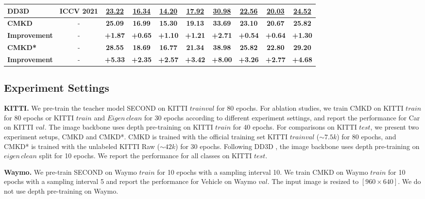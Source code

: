 \documentclass[runningheads]{llncs}
\begin{document}
\begin{table*}[t]
{\begin{tabular}{l|l|cccc|cccc}
    DD3D \cite{dd3d}     &ICCV 2021    & \underline{23.22}  & \underline{16.34}  & \underline{14.20} & \underline{17.92} & \underline{30.98}  & \underline{22.56}  & \underline{20.03} & \underline{24.52}\\
    \midrule
    \textbf{CMKD} &\multicolumn{1}{c|}{-}   & \textbf{25.09}  & \textbf{16.99}  & \textbf{15.30}  & \textbf{19.13} & \textbf{33.69}  & \textbf{23.10}  & \textbf{20.67} & \textbf{25.82} \\
    \textbf{Improvement} &\multicolumn{1}{c|}{-}  &\textbf{+1.87}  & \textbf{+0.65}  &\textbf{+1.10} &\textbf{+1.21} &\textbf{+2.71}  &\textbf{+0.54}  &\textbf{+0.64} &\textbf{+1.30} \\
    \midrule
    \textbf{CMKD*} &\multicolumn{1}{c|}{-}   & \textbf{28.55}  & \textbf{18.69}  & \textbf{16.77}  & \textbf{21.34}& \textbf{38.98}  & \textbf{25.82}  & \textbf{22.80}  & \textbf{29.20}\\
    \textbf{Improvement} &\multicolumn{1}{c|}{-} &\textbf{+5.33}  & \textbf{+2.35}  &\textbf{+2.57} &\textbf{+3.42} &\textbf{+8.00}  &\textbf{+3.26}  &\textbf{+2.77}  &\textbf{+4.68}\\
    \bottomrule
    \end{tabular}
    }
    \label{tab:car}
\end{table*}


\subsection{Experiment Settings}
\textbf{KITTI.}
We pre-train the teacher model SECOND \cite{second} on KITTI $trainval$ for 80 epochs.
For ablation studies, we train CMKD on KITTI $train$ for 80 epochs or KITTI $train$ and $Eigen\,clean$ for 30 epochs according to different experiment settings, and report the performance for Car on KITTI $val$.
The image backbone uses depth pre-training on KITTI $train$ for 40 epochs.
For comparisons on KITTI $test$, we present two experiment setups, CMKD and CMKD*.
CMKD is trained with the official training set KITTI $trainval$ ($\sim7.5k$) for 80 epochs,
and CMKD* is trained with the unlabeled KITTI Raw ($\sim42k$) for 30 epochs.
Following DD3D \cite{dd3d}, the image backbone uses depth pre-training on $eigen\,clean$ split for 10 epochs.
We report the performance for all classes on KITTI $test$. 

\noindent\textbf{Waymo.} We pre-train SECOND \cite{second} on Waymo $train$ for 10 epochs with a sampling interval 10. 
We train CMKD on Waymo $train$ for 10 epochs with a sampling interval 5 and report the performance for Vehicle on Waymo $val$. 
The input image is resized to $[960\times640]$. We do not use depth pre-training on Waymo.
\end{document}
